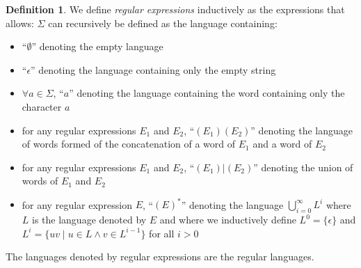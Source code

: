 \documentclass[12px]{article}
\theoremstyle{definition}
\newtheorem{definition}{Definition}
\begin{document}
        \begin{definition}%
          \label{def:regex}
          We define \emph{regular expressions} inductively as the expressions
          that allows:
          $\Sigma$ can recursively be defined as the language containing:
            \begin{itemize}
              \item ``$\emptyset$'' denoting the empty language
              \item ``$\epsilon$'' denoting the language containing only the
                empty string
              \item $\forall a \in \Sigma$, ``$a$'' denoting the language
                containing the word containing only the character $a$
              \item for any regular expressions $E_1$ and $E_2$, ``$(E_1)
                (E_2)$'' denoting the language of words formed of the
                concatenation of a word of $E_1$ and a word of $E_2$
              \item for any regular expressions $E_1$ and $E_2$,
                ``$(E_1)|(E_2)$'' denoting the union of words of $E_1$ and
                $E_2$
              \item for any regular expression $E$, ``${(E)}^*$'' denoting the
                language $\bigcup_{i = 0}^\infty L^i$ where $L$ is the
                language denoted by $E$ and where we inductively define $L^0 =
                \{\epsilon\}$ and $L^i = \{uv \mid u \in L \land v \in
                L^{i-1}\}$ for all $i > 0$
            \end{itemize}

          The languages denoted by regular expressions are the regular
          languages.

        \end{definition}
\end{document}
